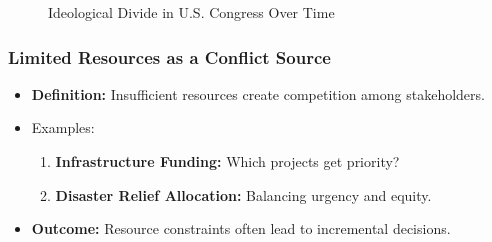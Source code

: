 \documentclass[10pt]{beamer}
\begin{document}
\begin{frame}
\begin{frame}
                    \begin{figure}
                        \centering
                        \caption{\scriptsize Ideological Divide in U.S. Congress Over Time}
                    \end{figure}
                \end{frame}
                
                \begin{frame}
                    \frametitle{Limited Resources as a Conflict Source}
                    \begin{itemize}
                        \item \textbf{Definition:} Insufficient resources create competition among stakeholders.
                        \item Examples:
                            \begin{enumerate}
                                \item \textbf{Infrastructure Funding:} Which projects get priority?
                                \item \textbf{Disaster Relief Allocation:} Balancing urgency and equity.
                            \end{enumerate}
                        \item \textbf{Outcome:} Resource constraints often lead to incremental decisions.
                    \end{itemize}
                    

\end{frame}
\end{frame}
\end{document}
